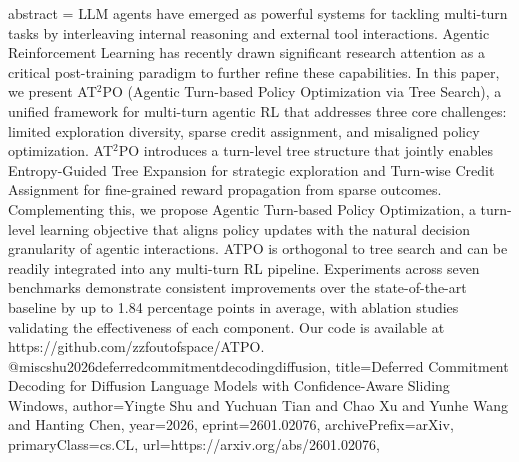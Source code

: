 {      abstract = {LLM agents have emerged as powerful systems for tackling multi-turn tasks by interleaving internal reasoning and external tool interactions. Agentic Reinforcement Learning has recently drawn significant research attention as a critical post-training paradigm to further refine these capabilities. In this paper, we present AT$^2$PO (Agentic Turn-based Policy Optimization via Tree Search), a unified framework for multi-turn agentic RL that addresses three core challenges: limited exploration diversity, sparse credit assignment, and misaligned policy optimization. AT$^2$PO introduces a turn-level tree structure that jointly enables Entropy-Guided Tree Expansion for strategic exploration and Turn-wise Credit Assignment for fine-grained reward propagation from sparse outcomes. Complementing this, we propose Agentic Turn-based Policy Optimization, a turn-level learning objective that aligns policy updates with the natural decision granularity of agentic interactions. ATPO is orthogonal to tree search and can be readily integrated into any multi-turn RL pipeline. Experiments across seven benchmarks demonstrate consistent improvements over the state-of-the-art baseline by up to 1.84 percentage points in average, with ablation studies validating the effectiveness of each component. Our code is available at https://github.com/zzfoutofspace/ATPO.}
}@misc{shu2026deferredcommitmentdecodingdiffusion,
      title={Deferred Commitment Decoding for Diffusion Language Models with Confidence-Aware Sliding Windows}, 
      author={Yingte Shu and Yuchuan Tian and Chao Xu and Yunhe Wang and Hanting Chen},
      year={2026},
      eprint={2601.02076},
      archivePrefix={arXiv},
      primaryClass={cs.CL},
      url={https://arxiv.org/abs/2601.02076},
}
